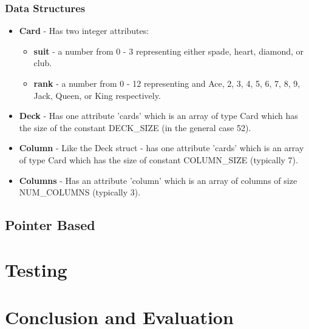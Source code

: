 \documentclass[11]{article}
\begin{document}
			\subsubsection{Data Structures}
				\begin{itemize}
					\item \textbf{Card} - Has two integer attributes:
						\begin{itemize}
							\item \textbf{suit} - a number from 0 - 3 representing either spade, heart, diamond, or club.
							\item \textbf{rank} - a number from 0 - 12 representing and Ace, 2, 3, 4, 5, 6, 7, 8, 9, Jack, Queen, or King respectively.
						\end{itemize}
					
					\item \textbf{Deck} - Has one attribute 'cards' which is an array of type Card which has the size of the constant DECK\_SIZE (in the general case 52).
					
					\item \textbf{Column} - Like the Deck struct - has one attribute 'cards' which is an array of type Card which has the size of constant COLUMN\_SIZE (typically 7).
					
					\item \textbf{Columns} - Has an attribute 'column' which is an array of columns of size NUM\_COLUMNS (typically 3).
				\end{itemize}
		\subsection{Pointer Based}
		
	\section{Testing}
	
	\section{Conclusion and Evaluation}
		
\end{document}
